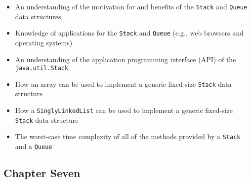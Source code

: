 \documentclass[11pt]{article}
\newcommand{\program}[1]{\lstinline{#1}}
\begin{document}
\begin{itemize}

  \item An understanding of the motivation for and benefits of the
    \program{Stack} and \program{Queue} data structures

  \item Knowledge of applications for the \program{Stack} and \program{Queue}
    (e.g., web browsers and operating systems)

  \item An understanding of the application programming interface (API) of the
    \program{java.util.Stack}

  \item How an array can be used to implement a generic fixed-size
    \program{Stack} data structure

  \item How a \program{SinglyLinkedList} can be used to implement a generic
    fixed-size \program{Stack} data structure

  \item The worst-case time complexity of all of the methods provided by a
    \program{Stack} and a \program{Queue}

\end{itemize}

\vspace*{-.2in}
\subsection*{Chapter Seven}
\end{document}
